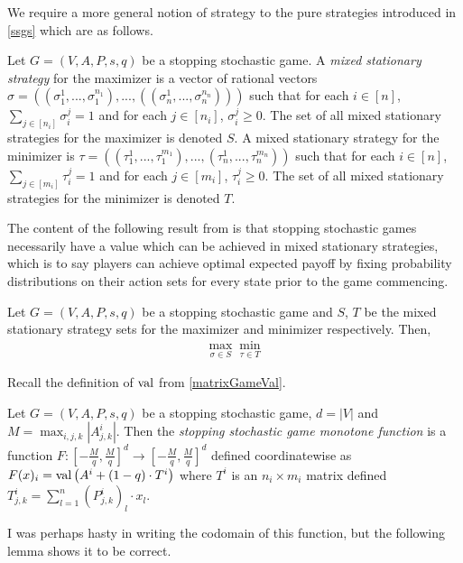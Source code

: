 We require a more general notion of strategy to the pure strategies introduced in \cref{ssgs} which
are as follows.
\begin{definition}
  Let $G = (V, A, P, s, q)$ be a stopping stochastic game. A \emph{mixed stationary strategy}
  for the maximizer is a vector of rational vectors 
  $\sigma = ((\sigma_1^{1}, ..., \sigma_1^{n_1}), ..., ((\sigma_n^{1}, ..., \sigma_n^{n_n})))$ such
  that for each $i \in [n]$, $\sum_{j \in [n_i]} \sigma_i^j = 1$ and for each $j \in [n_i]$, $\sigma_i^j \geq 0$.
  The set of all mixed stationary strategies for the maximizer is denoted $S$.
  A mixed stationary strategy for the minimizer is 
  $\tau = ((\tau_1^{1}, ..., \tau_1^{m_1}), ..., (\tau_n^{1}, ..., \tau_n^{m_n}))$
  such that for each $i \in [n]$, $\sum_{j \in [m_i]} \tau_i^j = 1$ 
  and for each $j \in [m_i]$, $\tau_i^j \geq 0$.
  The set of all mixed stationary strategies for the minimizer is denoted $T$.
\end{definition}
The content of the following result from \citep{shapley} is that stopping stochastic games
necessarily have a value which can be achieved in mixed stationary strategies, which is to say
players can achieve optimal expected payoff by fixing probability distributions on their action sets
for every state prior to the game commencing.
\begin{prop}
  Let $G = (V, A, P, s, q)$ be a stopping stochastic game and $S$, $T$ be the mixed stationary strategy
  sets for the maximizer and minimizer respectively. Then,
  \begin{align*}
    \max_{\sigma \in S} \min_{\tau \in T} 
  \end{align*}
\end{prop}
Recall the definition of $\mathrm{val}$ from \cref{matrixGameVal}.
\begin{definition} \label{shapleyMonotone}
  Let $G = (V, A, P, s, q)$ be a stopping stochastic game, $d = |V|$ and $M = \max_{i, j, k} |A_{j, k}^i|$. Then the
  \emph{stopping stochastic game monotone function} is a function
  $F : [-\frac{M}{q}, \frac{M}{q}]^d \to [-\frac{M}{q}, \frac{M}{q}]^d$ defined coordinatewise as
  $F(x)_i =  \mathrm{val} \left( A^i + (1 - q) \cdot T^i \right)$ where $T^i$ is an $n_i \times m_i$ matrix defined
  $T^i_{j, k} = \sum_{l = 1}^n (P_{j, k}^i)_l \cdot x_l$.
\end{definition}
I was perhaps hasty in writing the codomain of this function, but the following lemma
shows it to be correct.

